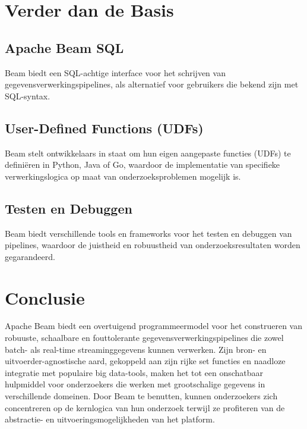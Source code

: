 \section{Verder dan de Basis}

\subsection{Apache Beam SQL}
Beam biedt een SQL-achtige interface voor het schrijven van gegevensverwerkingspipelines, als alternatief voor gebruikers die bekend zijn met SQL-syntax.

\subsection{User-Defined Functions (UDFs)}
Beam stelt ontwikkelaars in staat om hun eigen aangepaste functies (UDFs) te definiëren in Python, Java of Go, waardoor de implementatie van specifieke verwerkingslogica op maat van onderzoeksproblemen mogelijk is.

\subsection{Testen en Debuggen}
Beam biedt verschillende tools en frameworks voor het testen en debuggen van pipelines, waardoor de juistheid en robuustheid van onderzoeksresultaten worden gegarandeerd.

\section{Conclusie}

Apache Beam biedt een overtuigend programmeermodel voor het construeren van robuuste, schaalbare en fouttolerante gegevensverwerkingspipelines die zowel batch- als real-time streaminggegevens kunnen verwerken. Zijn bron- en uitvoerder-agnostische aard, gekoppeld aan zijn rijke set functies en naadloze integratie met populaire big data-tools, maken het tot een onschatbaar hulpmiddel voor onderzoekers die werken met grootschalige gegevens in verschillende domeinen. Door Beam te benutten, kunnen onderzoekers zich concentreren op de kernlogica van hun onderzoek terwijl ze profiteren van de abstractie- en uitvoeringsmogelijkheden van het platform.